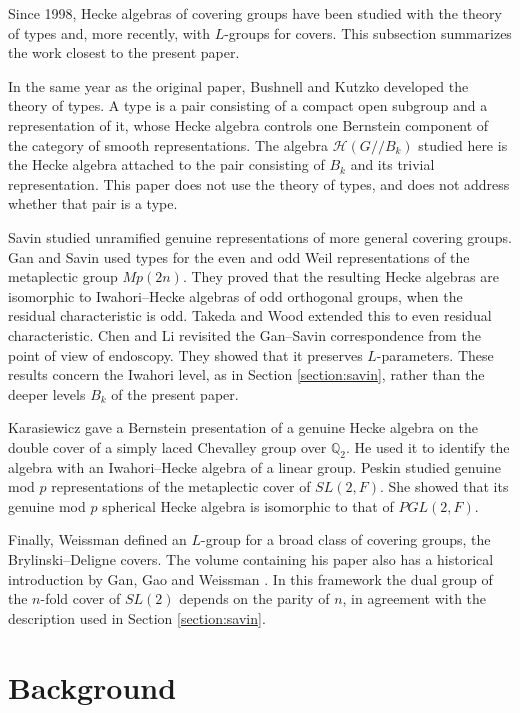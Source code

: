 \documentclass[12pt,letterpaper,reqno]{amsart}
\let\cal\mathcal
\theoremstyle{definition}
\theoremstyle{remark}
\numberwithin{equation}{section}
\begin{document}
Since 1998, Hecke algebras of covering groups have been studied with the
theory of types and, more recently, with $L$-groups for covers. This
subsection summarizes the work closest to the present paper.

In the same year as the original paper, Bushnell and Kutzko \cite{BK98}
developed the theory of types. A type is a pair consisting of a compact open
subgroup and a representation of it, whose Hecke algebra controls one
Bernstein component of the category of smooth representations. The algebra
${\cal H}(G//B_k)$ studied here is the Hecke algebra attached to the pair
consisting of $B_k$ and its trivial representation. This paper does not use
the theory of types, and does not address whether that pair is a type.

Savin \cite{Sa04} studied unramified genuine representations of more general
covering groups. Gan and Savin \cite{GS12} used types for the even and odd
Weil representations of the metaplectic group $Mp(2n)$. They proved that the
resulting Hecke algebras are isomorphic to Iwahori--Hecke algebras of odd
orthogonal groups, when the residual characteristic is odd. Takeda and Wood
\cite{TW18} extended this to even residual characteristic. Chen and Li
\cite{CL25} revisited the Gan--Savin correspondence from the point of view of
endoscopy. They showed that it preserves $L$-parameters. These results concern
the Iwahori level, as in Section \ref{section:savin}, rather than the deeper
levels $B_k$ of the present paper.

Karasiewicz \cite{Ka21} gave a Bernstein presentation of a genuine Hecke
algebra on the double cover of a simply laced Chevalley group over
$\mathbb{Q}_2$. He used it to identify the algebra with an Iwahori--Hecke
algebra of a linear group. Peskin \cite{Pe13} studied genuine mod $p$
representations of the metaplectic cover of $SL(2,F)$. She showed that its
genuine mod $p$ spherical Hecke algebra is isomorphic to that of $PGL(2,F)$.

Finally, Weissman \cite{We18} defined an $L$-group for a broad class of
covering groups, the Brylinski--Deligne covers. The volume containing his
paper also has a historical introduction by Gan, Gao and Weissman
\cite{GGW18}. In this framework the dual group of the $n$-fold cover of
$SL(2)$ depends on the parity of $n$, in agreement with the description used
in Section \ref{section:savin}.

\section{Background}
\label{sec:background}
\end{document}
